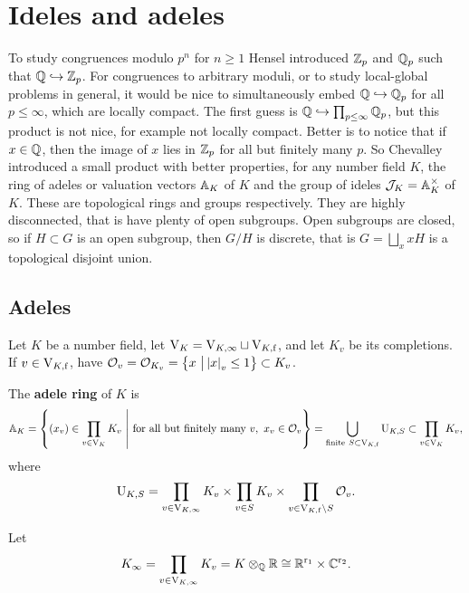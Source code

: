 \pagebreak

\section{Ideles and adeles}

To study congruences modulo $ p^n $ for $ n \ge 1 $ Hensel introduced $ \ZZ_p $ and $ \QQ_p $ such that $ \QQ \hookrightarrow \ZZ_p $. For congruences to arbitrary moduli, or to study local-global problems in general, it would be nice to simultaneously embed $ \QQ \hookrightarrow \QQ_p $ for all $ p \le \infty $, which are locally compact. The first guess is $ \QQ \hookrightarrow \prod_{p \le \infty} \QQ_p $, but this product is not nice, for example not locally compact. Better is to notice that if $ x \in \QQ $, then the image of $ x $ lies in $ \ZZ_p $ for all but finitely many $ p $. So Chevalley introduced a small product with better properties, for any number field $ K $, the ring of adeles or valuation vectors $ \AA_K $ of $ K $ and the group of ideles $ \JJJ_K = \AA_K^\times $ of $ K $. These are topological rings and groups respectively. They are highly disconnected, that is have plenty of open subgroups. Open subgroups are closed, so if $ H \subset G $ is an open subgroup, then $ G / H $ is discrete, that is $ G = \bigsqcup_x xH $ is a topological disjoint union.

\subsection{Adeles}

Let $ K $ be a number field, let $ \V_K = \V_{K, \infty} \sqcup \V_{K, \f} $, and let $ K_v $ be its completions. If $ v \in \V_{K, \f} $, have $ \OOO_v = \OOO_{K_v} = \cbr{x \st \abs{x}_v \le 1} \subset K_v $.

\begin{definition*}
The \textbf{adele ring} of $ K $ is
$$ \AA_K = \cbr{\br{x_v} \in \prod_{v \in \V_K} K_v \st \text{for all but finitely many} \ v, \ x_v \in \OOO_v} = \bigcup_{\text{finite} \ S \subset \V_{K, \f}} \U_{K, S} \subset \prod_{v \in \V_K} K_v, $$
where
$$ \U_{K, S} = \prod_{v \in \V_{K, \infty}} K_v \times \prod_{v \in S} K_v \times \prod_{v \in \V_{K, \f} \setminus S} \OOO_v. $$
\end{definition*}

\begin{notation*}
Let
$$ K_\infty = \prod_{v \in \V_{K, \infty}} K_v = K \otimes_\QQ \RR \cong \RR^{\r_1} \times \CC^{\r_2}. $$
\end{notation*}

